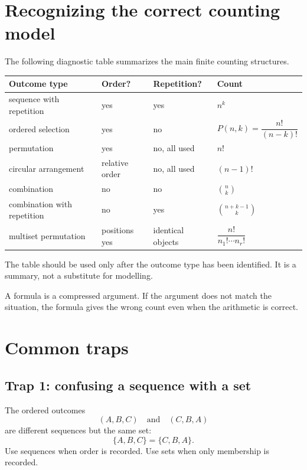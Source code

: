 \section{Recognizing the correct counting model}

The following diagnostic table summarizes the main finite counting structures.

\begin{center}
\begin{tabular}{llll}
\toprule
Outcome type & Order? & Repetition? & Count \\
\midrule
sequence with repetition & yes & yes & \(n^k\) \\
ordered selection & yes & no & \(P(n,k)=\dfrac{n!}{(n-k)!}\) \\
permutation & yes & no, all used & \(n!\) \\
circular arrangement & relative order & no, all used & \((n-1)!\) \\
combination & no & no & \(\binom{n}{k}\) \\
combination with repetition & no & yes & \(\binom{n+k-1}{k}\) \\
multiset permutation & positions yes & identical objects & \(\dfrac{n!}{n_1!\cdots n_r!}\) \\
\bottomrule
\end{tabular}
\end{center}

The table should be used only after the outcome type has been identified. It is a summary, not a substitute for modelling.

\begin{remarkbox}
A formula is a compressed argument. If the argument does not match the situation, the formula gives the wrong count even when the arithmetic is correct.
\end{remarkbox}

\section{Common traps}

\subsection*{Trap 1: confusing a sequence with a set}

The ordered outcomes
\[
(A,B,C)\quad\text{and}\quad(C,B,A)
\]
are different sequences but the same set:
\[
\{A,B,C\}=\{C,B,A\}.
\]
Use sequences when order is recorded. Use sets when only membership is recorded.

